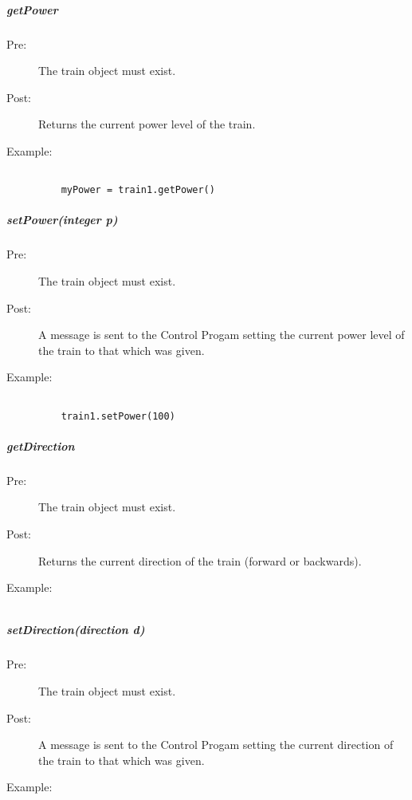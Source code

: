 \documentclass[a4paper,11pt,notitlepage]{article}
\def\CS{Control Progam\xspace} \def\LC{Local Copy of Train State\xspace} \def\TN{Track Node\xspace}
\begin{document}
\subparagraph{getPower} 
\begin{description}
\item[\hspace{1cm}Pre:] The train object must exist. 
\item[\hspace{1cm}Post:] Returns the current power level of the train.
\item[\hspace{1cm}Example:]
\begin{verbatim}

	myPower = train1.getPower()
\end{verbatim}
\end{description}


\subparagraph{setPower(integer p)} 
\begin{description}
\item[\hspace{1cm}Pre:] The train object must exist.
\item[\hspace{1cm}Post:] A message is sent to the \CS setting the current power level of the train to that which was given.
\item[\hspace{1cm}Example:]
\begin{verbatim}

	train1.setPower(100)
\end{verbatim}
\end{description}

\subparagraph{getDirection} 
\begin{description}
\item[\hspace{1cm}Pre:] The train object must exist. 
\item[\hspace{1cm}Post:] Returns the current direction of the train (forward or backwards).
\item[\hspace{1cm}Example:]
\begin{verbatim}

\end{verbatim}
\end{description}

\subparagraph{setDirection(direction d)} 
\begin{description}
\item[\hspace{1cm}Pre:] The train object must exist. 
\item[\hspace{1cm}Post:] A message is sent to the \CS setting the current direction of the train to that which was given.
\item[\hspace{1cm}Example:]
\begin{verbatim}

\end{verbatim}
\end{description}
\end{document}
